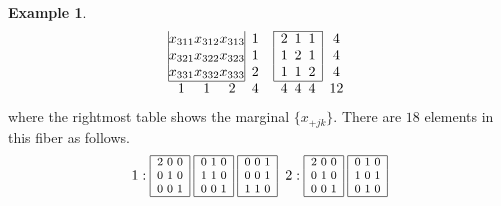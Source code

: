 \documentclass[12pt]{article}
\theoremstyle{definition}
\newtheorem{Example}[Theorem]{Example}
\begin{document}
\begin{Example}
\[\begin{array}{|@{}c@{}c@{}c@{}|c}
 x_{311} & x_{312}& x_{313}& 1\\
 x_{321} & x_{322}& x_{323}& 1\\
 x_{331} & x_{332}& x_{333}& 2\\ \cline{1-3}
  \multicolumn{1}{c}{1} & 1 & \multicolumn{1}{c}{2} & 4 
\end{array}
\hspace*{2mm}
\begin{array}{|@{}c@{}c@{}c@{}|c}\cline{1-3}
  2& 1& 1& 4\\
  1& 2& 1& 4\\
  1& 1& 2& 4\\ \cline{1-3}
  \multicolumn{1}{c}{4} & 4 & \multicolumn{1}{c}{4} & 12 
\end{array}
\]
where the rightmost table shows the marginal $\{x_{+jk}\}$. 
There are $18$ elements in this fiber as follows.
\[{\footnotesize
\hspace*{1mm}1: 
\begin{array}{|c|}\hline
2\ 0\ 0\\ 0\ 1\ 0\\ 0\ 0\ 1\\ \hline
\end{array}
\hspace*{1mm}
\begin{array}{|c|}\hline
0\ 1\ 0\\ 1\ 1\ 0\\ 0\ 0\ 1\\ \hline
\end{array}
\hspace*{1mm}
\begin{array}{|c|}\hline
0\ 0\ 1\\ 0\ 0\ 1\\ 1\ 1\ 0\\ \hline
\end{array}
\hspace*{0mm}
\hspace*{2mm}2: 
\begin{array}{|c|}\hline
2\ 0\ 0\\ 0\ 1\ 0\\ 0\ 0\ 1\\ \hline
\end{array}
\hspace*{1mm}
\begin{array}{|c|}\hline
0\ 1\ 0\\ 1\ 0\ 1\\ 0\ 1\ 0\\ \hline
\end{array}
\hspace*{1mm}
}\]
\end{Example}
\end{document}
